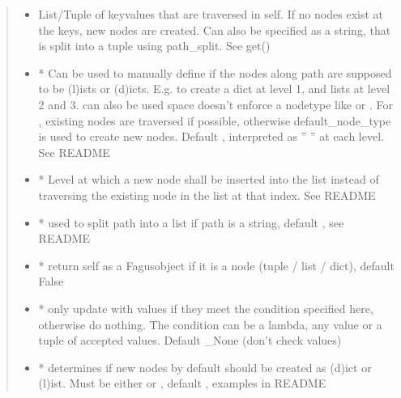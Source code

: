 \documentclass[a4paper,10pt,english]{sphinxmanual}
\begin{document}
\begin{fulllineitems}
\begin{fulllineitems}
\begin{quote}
\begin{description}
\begin{itemize}
\item {}
\sphinxAtStartPar
{} \textendash{} List/Tuple of key\sphinxhyphen{}values that are traversed in self. If no nodes exist at the keys, new nodes are
created. Can also be specified as a string, that is split into a tuple using path\_split. See get()

\item {}
\sphinxAtStartPar
{} \textendash{} * Can be used to manually define if the nodes along path are supposed to be (l)ists or
(d)icts. E.g.  to create a dict at level 1, and lists at level 2 and 3.  can also be
used \textendash{} space doesn’t enforce a node\sphinxhyphen{}type like  or . For , existing nodes are
traversed if possible, otherwise default\_node\_type is used to create new nodes. Default ,
interpreted as ” ” at each level. See README

\item {}
\sphinxAtStartPar
{} \textendash{} * Level at which a new node shall be inserted into the list instead of traversing the
existing node in the list at that index. See README

\item {}
\sphinxAtStartPar
{} \textendash{} * used to split path into a list if path is a string, default , see README

\item {}
\sphinxAtStartPar
{} \textendash{} * return self as a Fagus\sphinxhyphen{}object if it is a node (tuple / list / dict), default False

\item {}
\sphinxAtStartPar
{} \textendash{} * only update with values if they meet the condition specified here, otherwise do nothing. The
condition can be a lambda, any value or a tuple of accepted values. Default \_None (don’t check values)

\item {}
\sphinxAtStartPar
{} \textendash{} * determines if new nodes by default should be created as (d)ict or (l)ist. Must be
either  or , default , examples in README


\end{itemize}
\end{description}
\end{quote}
\end{fulllineitems}
\end{fulllineitems}
\end{document}
